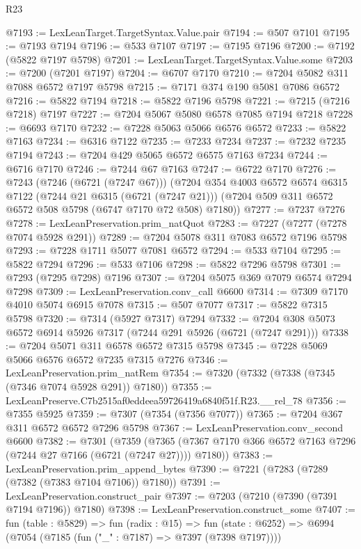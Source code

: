 \begin{lexlean}{R23}
\begin{coremodule}
@7193 := LexLeanTarget.TargetSyntax.Value.pair
@7194 := @507 @7101
@7195 := @7193 @7194
@7196 := @533 @7107
@7197 := @7195 @7196
@7200 := @7192 (@5822 @7197 @5798)
@7201 := LexLeanTarget.TargetSyntax.Value.some
@7203 := @7200 (@7201 @7197)
@7204 := @6707 @7170
@7210 := @7204 @5082 @311 @7088 @6572 @7197 @5798
@7215 := @7171 @374 @190 @5081 @7086 @6572
@7216 := @5822 @7194
@7218 := @5822 @7196 @5798
@7221 := @7215 (@7216 @7218) @7197
@7227 := @7204 @5067 @5080 @6578 @7085 @7194 @7218
@7228 := @6693 @7170
@7232 := @7228 @5063 @5066 @6576 @6572
@7233 := @5822 @7163
@7234 := @6316 @7122
@7235 := @7233 @7234
@7237 := @7232 @7235 @7194
@7243 := @7204 @429 @5065 @6572 @6575 @7163 @7234
@7244 := @6716 @7170
@7246 := @7244 @67 @7163
@7247 := @6722 @7170
@7276 := @7243
    (@7246 (@6721 (@7247 @67)))
    (@7204
      @354
      @4003
      @6572
      @6574
      @6315
      @7122
      (@7244 @21 @6315 (@6721 (@7247 @21)))
      (@7204 @509 @311 @6572 @6572 @508 @5798 (@6747 @7170 @72 @508) @7180))
@7277 := @7237 @7276
@7278 := LexLeanPreservation.prim_natQuot
@7283 := @7227 (@7277 (@7278 @7074 @5928 @291))
@7289 := @7204 @5078 @311 @7083 @6572 @7196 @5798
@7293 := @7228 @1711 @5077 @7081 @6572
@7294 := @533 @7104
@7295 := @5822 @7294
@7296 := @533 @7106
@7298 := @5822 @7296 @5798
@7301 := @7293 (@7295 @7298) @7196
@7307 := @7204 @5075 @369 @7079 @6574 @7294 @7298
@7309 := LexLeanPreservation.conv_call @6600
@7314 := @7309 @7170 @4010 @5074 @6915 @7078
@7315 := @507 @7077
@7317 := @5822 @7315 @5798
@7320 := @7314 (@5927 @7317) @7294
@7332 := @7204 @308 @5073 @6572 @6914 @5926 @7317 (@7244 @291 @5926 (@6721 (@7247 @291)))
@7338 := @7204 @5071 @311 @6578 @6572 @7315 @5798
@7345 := @7228 @5069 @5066 @6576 @6572 @7235 @7315 @7276
@7346 := LexLeanPreservation.prim_natRem
@7354 := @7320 (@7332 (@7338 (@7345 (@7346 @7074 @5928 @291)) @7180))
@7355 := LexLeanPreserve.C7b2515af0eddeea59726419a6840f51f.R23.__rel_78
@7356 := @7355 @5925
@7359 := @7307 (@7354 (@7356 @7077))
@7365 := @7204 @367 @311 @6572 @6572 @7296 @5798
@7367 := LexLeanPreservation.conv_second @6600
@7382 := @7301
    (@7359 (@7365 (@7367 @7170 @366 @6572 @7163 @7296 (@7244 @27 @7166 (@6721 (@7247 @27)))) @7180))
@7383 := LexLeanPreservation.prim_append_bytes
@7390 := @7221 (@7283 (@7289 (@7382 (@7383 @7104 @7106)) @7180))
@7391 := LexLeanPreservation.construct_pair
@7397 := @7203 (@7210 (@7390 (@7391 @7194 @7196)) @7180)
@7398 := LexLeanPreservation.construct_some
@7407 := fun (table : @5829) =>
  fun (radix : @15) =>
  fun (state : @6252) => @6994 (@7054 (@7185 (fun ("_" : @7187) => @7397 (@7398 @7197))))

\end{coremodule}
\end{lexlean}
